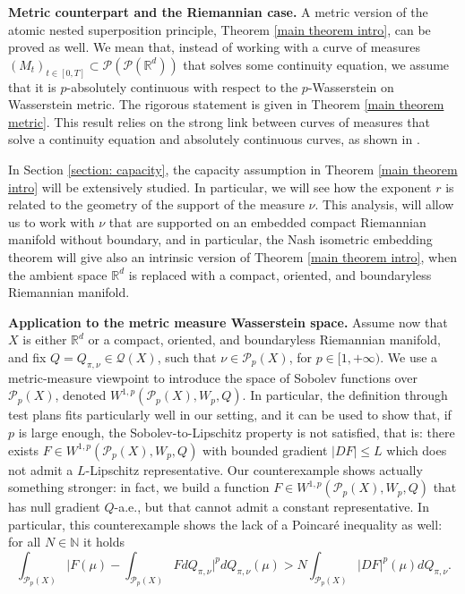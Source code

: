\documentclass[10pt,leqno]{amsart}
\numberwithin{equation}{section}
\newcommand{\R}{\mathbb{R}}
\newcommand{\N}{\mathbb{N}}
\newcommand{\PP}{\mathcal{P}}
\begin{document}
\bigskip

\textbf{Metric counterpart and the Riemannian case.} A metric version of the atomic nested superposition principle, Theorem \ref{main theorem intro}, can be proved as well. We mean that, instead of working with a curve of measures $(M_t)_{t\in[0,T]} \subset \PP(\PP(\R^d))$ that solves some continuity equation, we assume that it is $p$-absolutely continuous with respect to the $p$-Wasserstein on Wasserstein metric. The rigorous statement is given in Theorem \ref{main theorem metric}. This result relies on the strong link between curves of measures that solve a continuity equation and absolutely continuous curves, as shown in \cite{ambrosio2005gradient, stepanov2017three, pinzisavare2025}.

In Section \ref{section: capacity}, the capacity assumption in Theorem \ref{main theorem intro} will be extensively studied. In particular, we will see how the exponent $r$ is related to the geometry of the support of the measure $\nu$. This analysis, will allow us to work with $\nu$ that are supported on an embedded compact Riemannian manifold without boundary, and in particular, the Nash isometric embedding theorem will give also an intrinsic version of Theorem \ref{main theorem intro}, when the ambient space $\R^d$ is replaced with a compact, oriented, and boundaryless Riemannian manifold.

\bigskip

\textbf{Application to the metric measure Wasserstein space.} Assume now that $X$ is either $\R^d$ or a compact, oriented, and boundaryless Riemannian manifold, and fix $Q = Q_{\pi,\nu} \in \mathcal{Q}(X)$, such that $\nu\in \PP_p(X)$, for $p\in[1,+\infty)$. We use a metric-measure viewpoint to introduce the space of Sobolev functions over $\PP_p(X)$, denoted $W^{1,p}(\PP_p(X),W_p,Q)$. In particular, the definition through test plans fits particularly well in our setting, and it can be used to show that, if $p$ is large enough, the Sobolev-to-Lipschitz property is not satisfied, that is: there exists $F \in W^{1,p}(\PP_p(X),W_p,Q)$ with bounded gradient $|DF|\leq L$ which does not admit a $L$-Lipschitz representative. Our counterexample shows actually something stronger: in fact, we build a function $F \in W^{1,p}(\PP_p(X),W_p,Q)$ that has null gradient $Q$-a.e., but that cannot admit a constant representative. In particular, this counterexample shows the lack of a Poincar\'e inequality as well: for all $N\in \N$ it holds
\begin{equation}\label{eq: poincare intro}
    \int_{\PP_p(X)} \bigg| F(\mu) - \int_{\PP_p(X)} F dQ_{\pi,\nu} \bigg|^p dQ_{\pi,\nu}(\mu) > N \int_{\PP_p(X)} |DF|^p(\mu) dQ_{\pi,\nu}.
\end{equation}
\end{document}
